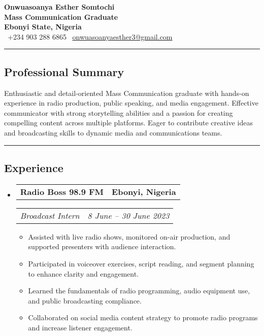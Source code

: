 \documentclass[11pt,letterpaper]{article}
\makeatletter
\newcommand{\headerrow}[2]{
  \begin{tabular*}{\linewidth}{l@{\extracolsep{\fill}}r}
    #1 & #2 \\
  \end{tabular*}
}
\makeatother
\begin{document}
\begin{center}
  {\LARGE \textbf{Onwuasoanya Esther Somtochi}}\\[4pt]
  \textbf{Mass Communication Graduate} \\[8pt]
  \textbf{Ebonyi State, Nigeria}\\[8pt]
  \raisebox{-0.1\height}{\faPhone} \ +234 903 288 6865 \hfill 
  \raisebox{-0.1\height}{\faEnvelope} \ \href{mailto:onwuasoanyaesther3@gmail.com}{onwuasoanyaesther3@gmail.com}
\end{center}

\vspace{0.2cm}
\hrule
\vspace{0.2cm}

\subsection*{Professional Summary}
Enthusiastic and detail-oriented Mass Communication graduate with hands-on experience in radio production, public speaking, and media engagement. Effective communicator with strong storytelling abilities and a passion for creating compelling content across multiple platforms. Eager to contribute creative ideas and broadcasting skills to dynamic media and communications teams.

\vspace{0.2cm}
\hrule
\vspace{0.2cm}

\subsection*{Experience}

\begin{itemize}[leftmargin=1em, itemsep=10pt]
  \item
    \headerrow{\textbf{Radio Boss 98.9 FM}}{\textbf{Ebonyi, Nigeria}}
    \headerrow{\emph{Broadcast Intern}}{\emph{8 June – 30 June 2023}}
    
    \begin{itemize}[leftmargin=1.5em, label=$\bullet$, itemsep=2pt]
      \item Assisted with live radio shows, monitored on-air production, and supported presenters with audience interaction.
      \item Participated in voiceover exercises, script reading, and segment planning to enhance clarity and engagement.
      \item Learned the fundamentals of radio programming, audio equipment use, and public broadcasting compliance.
      \item Collaborated on social media content strategy to promote radio programs and increase listener engagement.
    \end{itemize}
\end{itemize}
\end{document}
